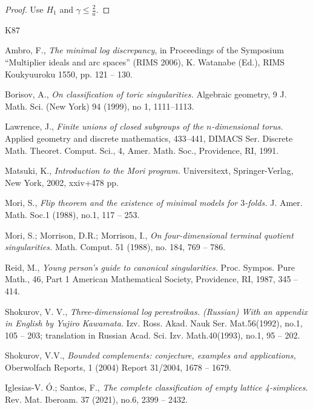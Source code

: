 \documentclass[12pt,reqno]{amsart}
\theoremstyle{plain}
\theoremstyle{definition}
\theoremstyle{remark}
\begin{document}
\begin{proof}
Use $H_1$ and $\gamma\le \frac{2}{a}$.
\end{proof}




\begin{thebibliography}{K87}


Ambro, F.,
{\em The minimal log discrepancy}, 
{in Proceedings of the Symposium ``Multiplier ideals and arc 
spaces'' (RIMS 2006), K. Watanabe (Ed.), RIMS Koukyuuroku 1550, pp. 121 -- 130.}

Borisov, A.,
{\em On classification of toric singularities.}
{Algebraic geometry, 9 J. Math. Sci. (New York)
94 (1999), no 1, 1111--1113.}

Lawrence, J., 
{\em Finite unions of closed subgroups of the $n$-dimensional 
torus.}
{Applied geometry and discrete mathematics, 433--441, 
DIMACS Ser. Discrete Math. Theoret. Comput. Sci., 4, 
Amer. Math. Soc., Providence, RI, 1991.}

Matsuki, K.,
{\em Introduction to the Mori program.}
{Universitext, Springer-Verlag, New York, 2002, xxiv+478 pp.}

Mori, S.,
{\em Flip theorem and the existence of minimal models for $3$-folds.}
{J. Amer. Math. Soc.1 (1988), no.1, 117 -- 253.}

Mori, S.; Morrison, D.R.; Morrison, I.,
{\em On four-dimensional terminal quotient singularities.}
{Math. Comput. 51 (1988), no. 184, 769 -- 786.}

Reid, M.,
{\em Young person's guide to canonical singularities.}
{Proc. Sympos. Pure Math., 46, Part 1
	American Mathematical Society, Providence, RI, 1987, 345 -- 414.}

Shokurov, V. V.,
{\em Three-dimensional log perestroikas. (Russian)
	With an appendix in English by Yujiro Kawamata.}
{Izv. Ross. Akad. Nauk Ser. Mat.56(1992), no.1, 105 -- 203; translation in
	Russian Acad. Sci. Izv. Math.40(1993), no.1, 95 -- 202.}

Shokurov, V.V.,
{\em Bounded complements: conjecture, examples and applications,}
{Oberwolfach Reports, 1 (2004) Report 31/2004, 1678 -- 1679.}


Iglesias-V. \'O.; Santos, F.,
{\em The complete classification of empty lattice 4-simplices.}
{Rev. Mat. Iberoam. 37 (2021), no.6, 2399 -- 2432.}

\end{thebibliography}
\end{document}
